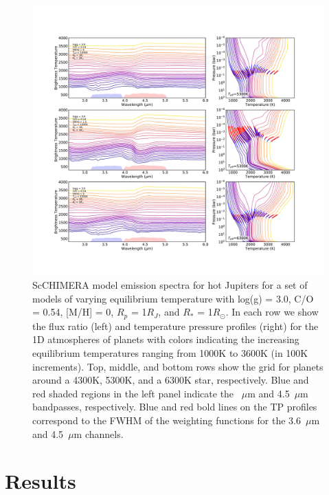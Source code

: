 \begin{figure}
    \centering
    \includegraphics[trim={2cm 2cm 2cm 2cm},clip,width=\linewidth]{SpectraTPweight.pdf}
    \caption{ScCHIMERA model emission spectra for hot Jupiters \citep{Piskorz2018} for a set of models of varying equilibrium temperature with log(g) = 3.0, C/O = 0.54, [M/H] = 0, $R_p$ = 1$R_J$, and $R_*$ = 1$R_\odot$. In each row we show the flux ratio (left) and temperature pressure profiles (right) for the 1D atmospheres of planets with colors indicating the increasing equilibrium temperatures ranging from 1000K to 3600K (in 100K increments). Top, middle, and bottom rows show the grid for planets around a 4300K, 5300K, and a 6300K star, respectively. Blue and red shaded regions in the left panel indicate the ~$\mu$m and 4.5~$\mu$m bandpasses, respectively. Blue and red bold lines on the TP profiles correspond to the FWHM of the weighting functions for the 3.6~$\mu$m and 4.5~$\mu$m channels.}
    \label{P2:fig:Linemodels}
\end{figure}



\section{Results}
\label{P2:sec:results}

